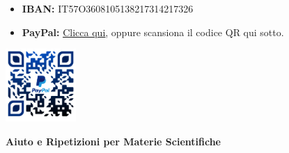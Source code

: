 \section*{}
\begin{itemize}
\item \textbf{IBAN:} IT57O3608105138217314217326\\
\item \textbf{PayPal:} \href {https://www.paypal.com/paypalme/MatematicaFisica/}{\underline{Clicca qui}}, oppure scansiona il codice QR qui sotto.
\end{itemize}
\begin{flushright}
  \includegraphics[width=0.2\textwidth]{../QR_PayPal.png}
\end{flushright}
 \textbf{Aiuto e Ripetizioni per Materie Scientifiche}
